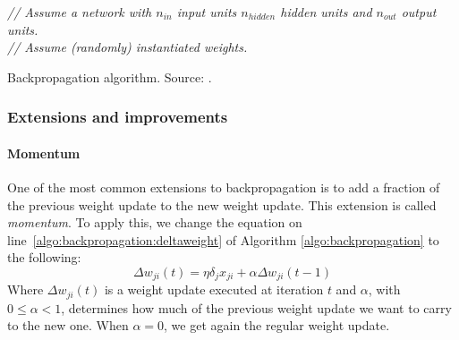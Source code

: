 \begin{algorithm}[htb]
\DontPrintSemicolon
{}
\emph{// Assume a network with $n_{in}$ input units $n_{hidden}$ hidden units and $n_{out}$ output units.}\\
\emph{// Assume (randomly) instantiated weights.}\\
\caption[Backpropagation]{Backpropagation algorithm. Source: \cite[Chapter~4]{ML}.}
\label{algo:backpropagation}
\end{algorithm}
\subsubsection{Extensions and improvements} %
\label{ssub:extensions_and_improvements}
\paragraph{Momentum} %
\label{par:momentum}
One of the most common extensions to backpropagation is to add a fraction of the previous weight update to the new weight update. This extension is called \textit{momentum}.
To apply this, we change the equation on line~\ref{algo:backpropagation:deltaweight} of Algorithm \ref{algo:backpropagation} to the following:
\begin{equation}
    \Delta w_{ji}(t) = \eta \delta_j x_{ji} + \alpha \Delta w_{ji}(t-1)
\end{equation}
Where $\Delta w_{ji}(t)$ is a weight update executed at iteration $t$ and $\alpha$, with $0 \le \alpha < 1$, determines how much of the previous weight update we want to carry to the new one. When $\alpha = 0$, we get again the regular weight update.

